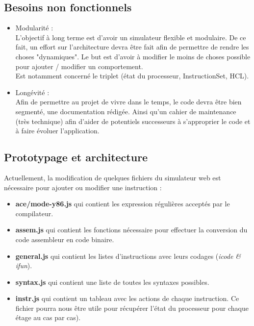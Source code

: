 \documentclass[french]{article}
\begin{document}
\subsection{Besoins non fonctionnels}
\begin{itemize}
    \item Modularité :\\
    L’objectif à long terme est d’avoir un simulateur flexible et modulaire. De ce fait, un effort sur l’architecture devra être fait afin de permettre de rendre les choses "dynamiques". Le but est d’avoir à modifier le moins de choses possible pour ajouter / modifier un comportement.\\
    Est notamment concerné le triplet (état du processeur, InstructionSet, HCL).
    
    \item Longévité :\\
    Afin de permettre au projet de vivre dans le temps, le code devra être bien segmenté, une documentation rédigée. Ainsi qu’un cahier de maintenance (très technique) afin d’aider de potentiels successeurs à s’approprier le code et à faire évoluer l'application.
\end{itemize}
    
\subsection{Prototypage et architecture}
Actuellement, la modification de quelques fichiers du simulateur web est nécessaire pour ajouter ou modifier une instruction :
\begin{itemize}
    \item \textbf{ace/mode-y86.js} qui contient les expression régulières acceptés par le compilateur.
    \item \textbf{assem.js} qui contient les fonctions nécessaire pour effectuer la conversion du code assembleur en code binaire.
    \item \textbf{general.js} qui contient les listes d'instructions avec leurs codages (\textit{icode \& ifun}).
    \item \textbf{syntax.js} qui contient une liste de toutes les syntaxes possibles.
    \item \textbf{instr.js} qui contient un tableau avec les actions de chaque instruction. Ce fichier pourra nous être utile pour récupérer l'état du processeur pour chaque étage au cas par cas). \\
\end{itemize}
\end{document}

